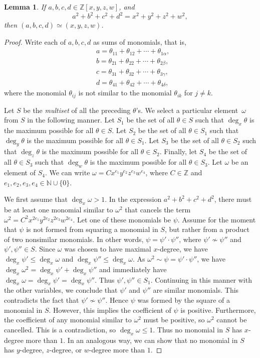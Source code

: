 \documentclass[12pt,table]{article}
\newtheorem{lemma}[theorem]{Lemma}
\theoremstyle{definition}
\theoremstyle{remark}
\newcommand{\Nnn}{\mathbb N}
\newcommand{\Zzz}{\mathbb Z}
\numberwithin{equation}{section}
\begin{document}
\begin{lemma}
If $a, b, c, d \in \Zzz[x,y,z,w]$, and
\[
a^2 + b^2 + c^2 + d^2 = x^2 + y^2 + z^2 + w^2,
\]
then $ (a, b, c, d ) \simeq (x, y, z, w )$.
\end{lemma}
\begin{proof}
Write each of $ a,b,c,d $ as sums of monomials, that is, 
\begin{align*}
&a = \theta_{11} + \theta_{12} + \dotsb + \theta_{1\alpha},
\\
&b = \theta_{21} + \theta_{22} + \dotsb + \theta_{2\beta},
\\
&c = \theta_{31} + \theta_{32} + \dotsb + \theta_{3\gamma},
\\
&d = \theta_{41} + \theta_{42} + \dotsb + \theta_{4\delta},
\end{align*}
where the monomial $ \theta_{ij}$ is not similar
to the monomial $\theta_{ik}$ for $ j \neq k$.

Let $S$ be the \emph{multiset} of all the preceding $ \theta $'s.
We select a particular element~$ \omega $
from $S$ in the following manner.
Let $ S_1 $ be the set of all $ \theta \in S  $ such that
$ \deg_x \theta $ is the maximum possible for all $ \theta \in S $.
Let $ S_2 $ be the set of all $ \theta \in S_1  $ such that
$ \deg_y \theta $ is the maximum possible for all $ \theta \in S_1 $.
Let $ S_3 $ be the set of all $ \theta \in S_2  $ such that
$ \deg_z \theta $ is the maximum possible for all $ \theta \in S_2 $.
Finally, let $ S_4 $ be the set of all $ \theta \in S_3  $ such that
$ \deg_w \theta $ is the maximum possible for all $ \theta \in S_3 $.
Let $ \omega $ be an element of $ S_4 $. 
We can write $ \omega = Cx^{e_1}y^{e_2}z^{e_3}w^{e_4}$, where $ C \in \Zzz $
and $ e_1,e_2,e_3,e_4 \in \Nnn \cup \{0\} $.

We first assume that $\deg_x \omega > 1 $.
In the expression  
$a^2 + b^2 + c^2 + d^2$, there must be at least one monomial similar to $ \omega^2 $
that cancels the term $ \omega^2 = C^2x^{2e_1}y^{2e_2}z^{2e_3}w^{2e_4}$.
Let one of these monomials be $ \psi $. Assume for the moment that $ \psi $
is not formed from squaring a monomial in $S$, but rather
from a product of two nonsimilar monomials.
In other words, $ \psi = \psi' \cdot \psi''$, where $ \psi' \nsim \psi'' $
and $ \psi' , \psi'' \in S $. Since $\omega$ was chosen to have maximal $x$-degree,
we have $\deg_x \psi' \leq \deg_x \omega$ and
$\deg_x \psi'' \leq \deg_x \omega$.
As $\omega^2 \sim \psi = \psi' \cdot \psi''$,
we have $ \deg_x \omega^2 = \deg_x \psi' + \deg_x \psi''$
and immediately have $ \deg_x \omega = \deg_x \psi' = \deg_x \psi'' $.
Thus $ \psi' , \psi'' \in S_1 $. Continuing in this manner
with the other variables, we
conclude that $ \psi' $ and $ \psi'' $ are similar monomials.
This contradicts the fact that $ \psi' \nsim \psi'' $.
Hence $ \psi $ was
formed by the square of a monomial in $ S $. However, this implies the coefficient
of $ \psi $ is positive. Furthermore, the coefficient of
any monomial similar to $ \omega^2 $ must be positive,
so $ \omega^2 $ cannot be cancelled. This is
a contradiction, so $ \deg_x \omega \leq 1 $. Thus no monomial in $S$ has $x$-degree more
than $1$. In an analogous way, we can show that no monomial in $S$ has $y$-degree, $z$-degree,
or $w$-degree more than $1$.


\end{proof}
\end{document}
